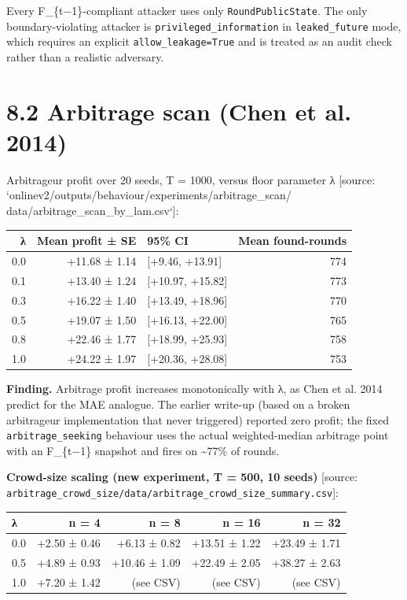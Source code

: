 \documentclass[11pt,a4paper,openany]{report}
\begin{document}
Every F\_\{t−1\}-compliant attacker uses only \texttt{RoundPublicState}. The only
boundary-violating attacker is \texttt{privileged\_information} in
\texttt{leaked\_future} mode, which requires an explicit \texttt{allow\_leakage=True}
and is treated as an audit check rather than a realistic adversary.

\section{8.2 Arbitrage scan (Chen et al. 2014)}

Arbitrageur profit over 20 seeds, T = 1000, versus floor parameter λ
[source: `onlinev2/outputs/behaviour/experiments/arbitrage\_scan/
data/arbitrage\_scan\_by\_lam.csv`]:

\begin{center}
\small
\begin{tabular}{rrlr}
\toprule
\textbf{λ} & \textbf{Mean profit ± SE} & \textbf{95\% CI} & \textbf{Mean found-rounds} \\
\midrule
0.0 & +11.68 ± 1.14 & [+9.46, +13.91] & 774 \\
0.1 & +13.40 ± 1.24 & [+10.97, +15.82] & 773 \\
0.3 & +16.22 ± 1.40 & [+13.49, +18.96] & 770 \\
0.5 & +19.07 ± 1.50 & [+16.13, +22.00] & 765 \\
0.8 & +22.46 ± 1.77 & [+18.99, +25.93] & 758 \\
1.0 & +24.22 ± 1.97 & [+20.36, +28.08] & 753 \\
\bottomrule
\end{tabular}
\end{center}

\textbf{Finding.} Arbitrage profit increases monotonically with λ, as Chen
et al. 2014 predict for the MAE analogue. The earlier write-up (based
on a broken arbitrageur implementation that never triggered) reported
zero profit; the fixed \texttt{arbitrage\_seeking} behaviour uses the actual
weighted-median arbitrage point with an F\_\{t−1\} snapshot and fires on
\textasciitilde{}77\% of rounds.

\textbf{Crowd-size scaling (new experiment, T = 500, 10 seeds)} [source:
\texttt{arbitrage\_crowd\_size/data/arbitrage\_crowd\_size\_summary.csv}]:

\begin{center}
\small
\begin{tabular}{lrrrr}
\toprule
\textbf{λ} & \textbf{n = 4} & \textbf{n = 8} & \textbf{n = 16} & \textbf{n = 32} \\
\midrule
0.0 & +2.50 ± 0.46 & +6.13 ± 0.82 & +13.51 ± 1.22 & +23.49 ± 1.71 \\
0.5 & +4.89 ± 0.93 & +10.46 ± 1.09 & +22.49 ± 2.05 & +38.27 ± 2.63 \\
1.0 & +7.20 ± 1.42 & (see CSV) & (see CSV) & (see CSV) \\
\bottomrule
\end{tabular}
\end{center}
\end{document}
